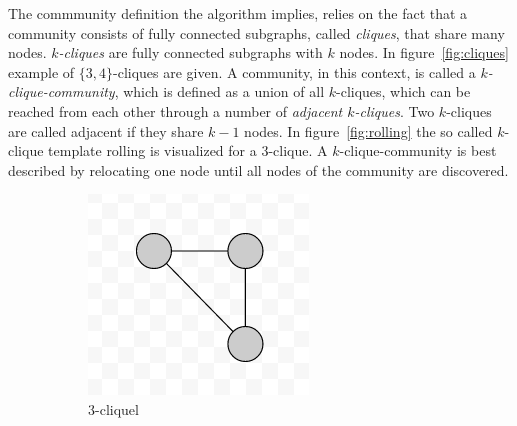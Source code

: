 \documentclass[runningheads,a4paper]{llncs}
\begin{document}
The commmunity definition the algorithm implies, relies on the fact that a community consists of fully connected subgraphs, called \emph{cliques}, that share many nodes.
\emph{$k$-cliques} are fully connected subgraphs with $k$ nodes.
In figure~\ref{fig:cliques} example of $\{3,4\}$-cliques are given.
A community, in this context, is called a \emph{$k$-clique-community}, which is defined as a union of all $k$-cliques, which can be reached from each other through a number of \emph{adjacent $k$-cliques}.
Two $k$-cliques are called adjacent if they share $k-1$ nodes.
In figure~\ref{fig:rolling} the so called $k$-clique template rolling is visualized for a $3$-clique.
A $k$-clique-community is best described by relocating one node until all nodes of the community are discovered.

\begin{figure}
    \centering
    \begin{subfigure}[b]{0.3\textwidth}
        \includegraphics[width=\textwidth]{3-clique}
        \caption{3-cliquel}
        \label{fig:3clique}
    \end{subfigure}
    ~ %
    \begin{subfigure}[b]{0.3\textwidth}

\end{subfigure}
\end{figure}
\end{document}
